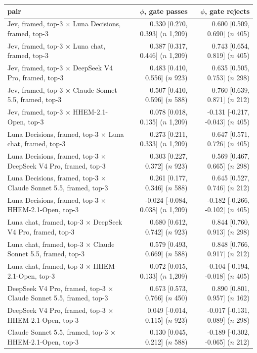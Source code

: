 \begin{tabular}{lrr}
\toprule
pair & $\phi$, gate passes & $\phi$, gate rejects \\
\midrule
Jev, framed, top-3 $\times$ Luna Decisions, framed, top-3 & 0.330 [0.270, 0.393] ($n$ 1,209) & 0.600 [0.509, 0.690] ($n$ 405) \\
Jev, framed, top-3 $\times$ Luna chat, framed, top-3 & 0.387 [0.317, 0.446] ($n$ 1,209) & 0.743 [0.654, 0.819] ($n$ 405) \\
Jev, framed, top-3 $\times$ DeepSeek V4 Pro, framed, top-3 & 0.483 [0.410, 0.556] ($n$ 923) & 0.635 [0.505, 0.753] ($n$ 298) \\
Jev, framed, top-3 $\times$ Claude Sonnet 5.5, framed, top-3 & 0.507 [0.410, 0.596] ($n$ 588) & 0.760 [0.639, 0.871] ($n$ 212) \\
Jev, framed, top-3 $\times$ HHEM-2.1-Open, top-3 & 0.078 [0.018, 0.135] ($n$ 1,209) & -0.131 [-0.217, -0.043] ($n$ 405) \\
Luna Decisions, framed, top-3 $\times$ Luna chat, framed, top-3 & 0.273 [0.211, 0.333] ($n$ 1,209) & 0.647 [0.571, 0.726] ($n$ 405) \\
Luna Decisions, framed, top-3 $\times$ DeepSeek V4 Pro, framed, top-3 & 0.303 [0.227, 0.372] ($n$ 923) & 0.569 [0.467, 0.665] ($n$ 298) \\
Luna Decisions, framed, top-3 $\times$ Claude Sonnet 5.5, framed, top-3 & 0.261 [0.177, 0.346] ($n$ 588) & 0.645 [0.527, 0.746] ($n$ 212) \\
Luna Decisions, framed, top-3 $\times$ HHEM-2.1-Open, top-3 & -0.024 [-0.084, 0.038] ($n$ 1,209) & -0.182 [-0.266, -0.102] ($n$ 405) \\
Luna chat, framed, top-3 $\times$ DeepSeek V4 Pro, framed, top-3 & 0.680 [0.612, 0.742] ($n$ 923) & 0.844 [0.760, 0.913] ($n$ 298) \\
Luna chat, framed, top-3 $\times$ Claude Sonnet 5.5, framed, top-3 & 0.579 [0.493, 0.669] ($n$ 588) & 0.848 [0.766, 0.917] ($n$ 212) \\
Luna chat, framed, top-3 $\times$ HHEM-2.1-Open, top-3 & 0.072 [0.015, 0.133] ($n$ 1,209) & -0.104 [-0.194, -0.018] ($n$ 405) \\
DeepSeek V4 Pro, framed, top-3 $\times$ Claude Sonnet 5.5, framed, top-3 & 0.673 [0.573, 0.766] ($n$ 450) & 0.890 [0.801, 0.957] ($n$ 162) \\
DeepSeek V4 Pro, framed, top-3 $\times$ HHEM-2.1-Open, top-3 & 0.049 [-0.014, 0.115] ($n$ 923) & -0.017 [-0.131, 0.089] ($n$ 298) \\
Claude Sonnet 5.5, framed, top-3 $\times$ HHEM-2.1-Open, top-3 & 0.130 [0.045, 0.212] ($n$ 588) & -0.189 [-0.302, -0.065] ($n$ 212) \\
\bottomrule
\end{tabular}

